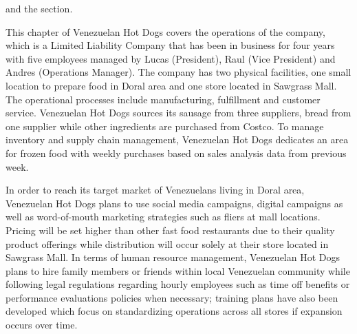  and the section.

This chapter of Venezuelan Hot Dogs covers the operations of the company, which is a Limited Liability Company that has been in business for four years with five employees managed by Lucas (President), Raul (Vice President) and Andres (Operations Manager). The company has two physical facilities, one small location to prepare food in Doral area and one store located in Sawgrass Mall. The operational processes include manufacturing, fulfillment and customer service. Venezuelan Hot Dogs sources its sausage from three suppliers, bread from one supplier while other ingredients are purchased from Costco. To manage inventory and supply chain management, Venezuelan Hot Dogs dedicates an area for frozen food with weekly purchases based on sales analysis data from previous week. 

In order to reach its target market of Venezuelans living in Doral area, Venezuelan Hot Dogs plans to use social media campaigns, digital campaigns as well as word-of-mouth marketing strategies such as fliers at mall locations. Pricing will be set higher than other fast food restaurants due to their quality product offerings while distribution will occur solely at their store located in Sawgrass Mall. In terms of human resource management, Venezuelan Hot Dogs plans to hire family members or friends within local Venezuelan community while following legal regulations regarding hourly employees such as time off benefits or performance evaluations policies when necessary; training plans have also been developed which focus on standardizing operations across all stores if expansion occurs over time.